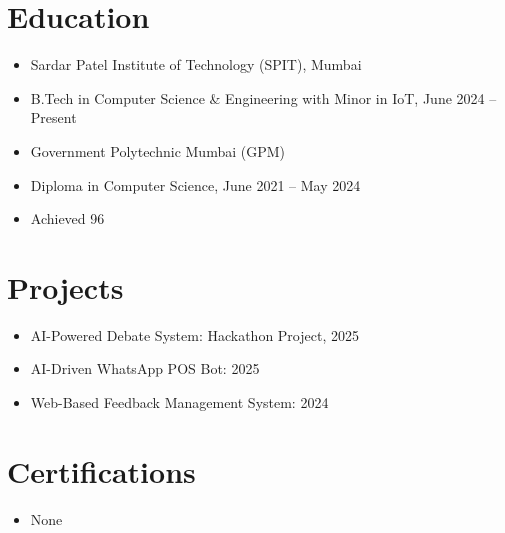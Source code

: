 \documentclass[10pt]{article}
\begin{document}
\section*{Education}
\vspace{0.05cm}
\begin{itemize}[leftmargin=0.5cm, itemsep=2pt]

  \item Sardar Patel Institute of Technology (SPIT), Mumbai

  \item B.Tech in Computer Science & Engineering with Minor in IoT, June 2024 – Present

  \item Government Polytechnic Mumbai (GPM)

  \item Diploma in Computer Science, June 2021 – May 2024

  \item Achieved 96%

\end{itemize}



\section*{Projects}
\vspace{0.05cm}
\begin{itemize}[leftmargin=0.5cm, itemsep=2pt]

  \item AI-Powered Debate System: Hackathon Project, 2025

  \item AI-Driven WhatsApp POS Bot: 2025

  \item Web-Based Feedback Management System: 2024

\end{itemize}



\section*{Certifications}
\vspace{0.05cm}
\begin{itemize}[leftmargin=0.5cm, itemsep=2pt]

  \item None

\end{itemize}
\end{document}
